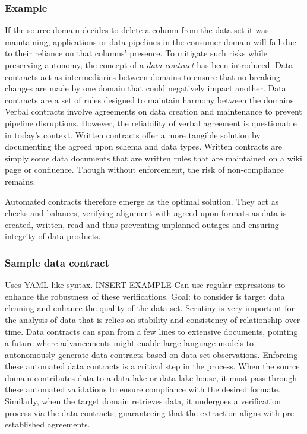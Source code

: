 \documentclass[a4paper, 11pt]{book}
\begin{document}
    \subsubsection{Example}
    If the source domain decides to delete a column from the data set it was maintaining, applications or data pipelines in the consumer domain will fail due to their reliance on that columns' presence.
    To mitigate such risks while preserving autonomy, the concept of a \textit{data contract} has been introduced.
    Data contracts act as intermediaries between domains to ensure that no breaking changes are made by one domain that could negatively impact another.
    Data contracts are a set of rules designed to maintain harmony between the domains.
    Verbal contracts involve agreements on data creation and maintenance to prevent pipeline disruptions.
    However, the reliability of verbal agreement is questionable in today's context.
    Written contracts offer a more tangible solution by documenting the agreed upon schema and data types.
    Written contracts are simply some data documents that are written rules that are maintained on a wiki page or confluence.
    Though without enforcement, the risk of non-compliance remains.

    Automated contracts therefore emerge as the optimal solution.
    They act as checks and balances, verifying alignment with agreed upon formats as data is created, written, read and thus preventing unplanned outages and ensuring integrity of data products.

    \subsubsection{Sample data contract}
    Uses YAML like syntax.
    INSERT EXAMPLE
    Can use regular expressions to enhance the robustness of these verifications.
    Goal: to consider is target data cleaning and enhance the quality of the data set.
    Scrutiny is very important for the analysis of data that is relies on stability and consistency of relationship over time.
    Data contracts can span from a few lines to extensive documents, pointing a future where advancements might enable large language models to autonomously generate data contracts based on data set observations.
    Enforcing these automated data contracts is a critical step in the process.
    When the source domain contributes data to a data lake or data lake house, it must pass through these automated validations to ensure compliance with the desired formate.
    Similarly, when the target domain retrieves data, it undergoes a verification process via the data contracts; guaranteeing that the extraction aligns with pre-established agreements.
\end{document}
